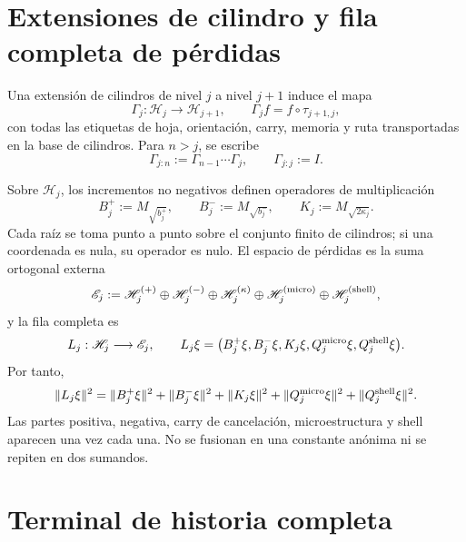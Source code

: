 \section{Extensiones de cilindro y fila completa de pérdidas}
\label{sec:pdfv2-sol-gamma-loss}

Una extensión de cilindros de nivel \(j\) a nivel \(j+1\) induce el mapa
\begin{equation}\label{eq:pdfv2-sol-gamma}
 \Gamma_j:\mathscr H_j\longrightarrow\mathscr H_{j+1},
 \qquad
 \Gamma_j f=f\circ\tau_{j+1,j},
\end{equation}
con todas las etiquetas de hoja, orientación, carry, memoria y ruta
transportadas en la base de cilindros.  Para \(n>j\), se escribe
\begin{equation}\label{eq:pdfv2-sol-gamma-composition}
 \Gamma_{j:n}:=\Gamma_{n-1}\cdots\Gamma_j,
 \qquad
 \Gamma_{j:j}:=I.
\end{equation}

Sobre \(\mathscr H_j\), los incrementos no negativos definen operadores de
multiplicación
\begin{equation}\label{eq:pdfv2-sol-loss-multipliers}
 B_j^+:=M_{\sqrt{b_j^+}},
 \qquad
 B_j^-:=M_{\sqrt{b_j^-}},
 \qquad
 K_j:=M_{\sqrt{2\kappa_j}}.
\end{equation}
Cada raíz se toma punto a punto sobre el conjunto finito de cilindros; si una
coordenada es nula, su operador es nulo.  El espacio de pérdidas es la suma
ortogonal externa
\[
 \mathscr E_j
 :=\mathscr H_j^{(+)}\oplus\mathscr H_j^{(-)}
   \oplus\mathscr H_j^{(\kappa)}
   \oplus\mathscr H_j^{({\rm micro})}
   \oplus\mathscr H_j^{({\rm shell})},
\]
y la fila completa es
\begin{equation}\label{eq:pdfv2-sol-loss-row}
 L_j:\mathscr H_j\longrightarrow\mathscr E_j,
 \qquad
 L_j\xi
 =\bigl(
 B_j^+\xi,B_j^-\xi,K_j\xi,
 Q_j^{\rm micro}\xi,Q_j^{\rm shell}\xi
 \bigr).
\end{equation}
Por tanto,
\begin{equation}\label{eq:pdfv2-sol-loss-norm}
 \|L_j\xi\|^2
 =\|B_j^+\xi\|^2+\|B_j^-\xi\|^2+\|K_j\xi\|^2
  +\|Q_j^{\rm micro}\xi\|^2
  +\|Q_j^{\rm shell}\xi\|^2.
\end{equation}
Las partes positiva, negativa, carry de cancelación, microestructura y shell
aparecen una vez cada una.  No se fusionan en una constante anónima ni se
repiten en dos sumandos.

\section{Terminal de historia completa}
\label{sec:pdfv2-sol-terminal}

